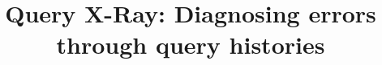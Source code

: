 



\newcommand{\red}[1]{\textcolor{red}{#1}}
\newcommand{\green}[1]{\textcolor{green}{#1}}
\newcommand{\blue}[1]{\textcolor{blue}{#1}}
\newcommand{\orange}[1]{\textcolor{orange}{#1}}
\newcommand{\darkred}[1]{\textcolor{darkred}{#1}}
\newcommand{\darkgreen}[1]{\textcolor{darkgreen}{#1}}
\newcommand{\darkblue}[1]{\textcolor{darkblue}{#1}}


\newcommand{\alex}[1]{\noindent{\color{darkgreen}{Alexandra: #1}}}
\newcommand{\xlw}[1]{\noindent{\color{blue}{Xiaolan: #1}}}
\newcommand{\ewu}[1]{\noindent{\color{red}{EWu: #1}}}
\newcommand{\xxx}[1]{{\fontsize{13pt}{13pt}\selectfont\textcolor{red}{#1}}}
\newcommand{\codesize}{\fontsize{7}{8}}
\newcommand{\stitle}[1]{\vspace{0.5em}\noindent\textbf{#1}}
\newcommand{\calF}[0]{$\cal{F}$}

\newcommand{\ind}{\hspace{\algorithmicindent}}
\newcommand{\sys}{\textsc{QueryXRay}\xspace}
\newcommand{\gcost}{{\sc Greedy-Cost}\xspace}

\newcommand{\deprecate}[1]{}

\newcommand{\prob}{{\sc Data-Fracking}\xspace}
\newcommand{\exact}{{\sc EXACTSOL}\xspace}
\newcommand{\qfix}{{\sc SingleQueryFix}\xspace}
\newcommand{\density}{{\sc DENSITY}\xspace}





\title{Query X-Ray: Diagnosing errors through query histories}



